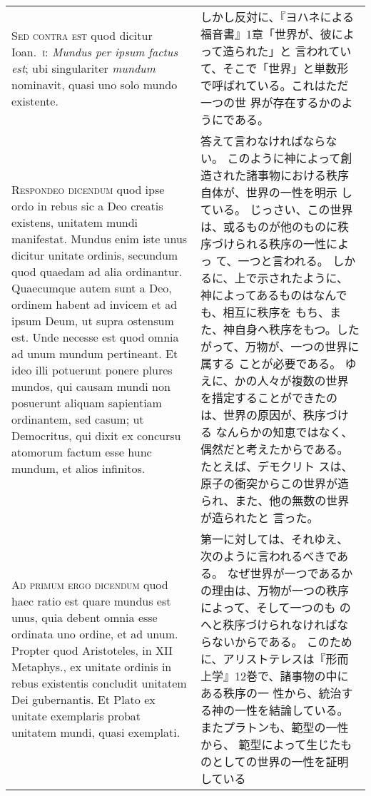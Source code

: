 \documentclass[10pt]{jsarticle} %
\begin{document}
\begin{longtable}{p{21em}p{21em}}
\\
{\scshape Sed contra est} quod dicitur Ioan.~{\scshape i}: {\itshape
Mundus per ipsum factus est}; ubi singulariter {\itshape mundum}
nominavit, quasi uno solo mundo existente. 
 &
しかし反対に、『ヨハネによる福音書』1章「世界が、彼によって造られた」と
 言われていて、そこで「世界」と単数形で呼ばれている。これはただ一つの世
 界が存在するかのようにである。

\\

{\scshape Respondeo dicendum} quod ipse ordo in rebus sic
a Deo creatis existens, unitatem mundi manifestat. Mundus enim iste unus
dicitur unitate ordinis, secundum quod quaedam ad alia
ordinantur. Quaecumque autem sunt a Deo, ordinem habent ad invicem et ad
ipsum Deum, ut supra ostensum est. Unde necesse est quod omnia ad unum
mundum pertineant. Et ideo illi potuerunt ponere plures mundos, qui
causam mundi non posuerunt aliquam sapientiam ordinantem, sed casum; ut
Democritus, qui dixit ex concursu atomorum factum esse hunc mundum, et
alios infinitos.

&

答えて言わなければならない。
このように神によって創造された諸事物における秩序自体が、世界の一性を明示
 している。
じっさい、この世界は、或るものが他のものに秩序づけられる秩序の一性によっ
 て、一つと言われる。
しかるに、上で示されたように、神によってあるものはなんでも、相互に秩序を
 もち、また、神自身へ秩序をもつ。したがって、万物が、一つの世界に属する
 ことが必要である。
ゆえに、かの人々が複数の世界を措定することができたのは、世界の原因が、秩序づける
 なんらかの知恵ではなく、偶然だと考えたからである。たとえば、デモクリト
 スは、原子の衝突からこの世界が造られ、また、他の無数の世界が造られたと
 言った。

\\


{\scshape Ad primum ergo dicendum} quod haec ratio est quare mundus est
unus, quia debent omnia esse ordinata uno ordine, et ad unum. Propter
quod Aristoteles, in XII Metaphys.{\itshape }, ex unitate ordinis in
rebus existentis concludit unitatem Dei gubernantis. Et Plato ex unitate
exemplaris probat unitatem mundi, quasi exemplati.  &

第一に対しては、それゆえ、次のように言われるべきである。
なぜ世界が一つであるかの理由は、万物が一つの秩序によって、そして一つのも
 のへと秩序づけられなければならないからである。
このために、アリストテレスは『形而上学』12巻で、諸事物の中にある秩序の一
 性から、統治する神の一性を結論している。またプラトンも、範型の一性から、
 範型によって生じたものとしての世界の一性を証明している



\end{longtable}
\end{document}

